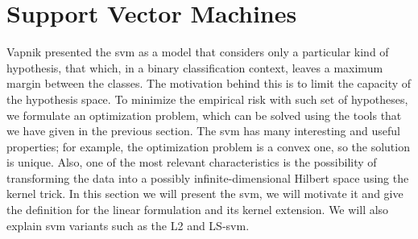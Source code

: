 \section{Support Vector Machines}
Vapnik presented the \acrshort{svm} as a model that considers only a particular kind of hypothesis, that which, in a binary classification context, leaves a maximum margin between the classes. The motivation behind this is to limit the capacity of the hypothesis space. To minimize the empirical risk with such set of hypotheses, we formulate an optimization problem, which can be solved using the tools that we have given in the previous section. The \acrshort{svm} has many interesting and useful properties; for example, the optimization problem is a convex one, so the solution is unique. Also, one of the most relevant characteristics is the possibility of transforming the data into a possibly infinite-dimensional Hilbert space using the kernel trick.
In this section we will present the \acrshort{svm}, we will motivate it and give the definition for the linear formulation and its kernel extension. We will also explain \acrshort{svm} variants such as the L2 and LS-\acrshort{svm}.

